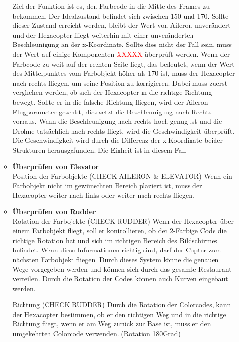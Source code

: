 \begin{itemize}
\begin{itemize}
        Ziel der Funktion ist es, den Farbcode in die Mitte des Frames zu bekommen. Der Idealzustand befindet sich zwischen 150 und 170.
        Sollte dieser Zustand erreicht werden, bleibt der Wert von Aileron unverändert und der Hexacopter fliegt weiterhin mit einer unveränderten Beschleunigung an der
        x-Koordinate.
        Sollte dies nicht der Fall sein, muss der Wert auf einige Komponenten \textcolor{red}{XXXXX} überprüft werden.
        Wenn der Farbcode zu weit auf der rechten Seite liegt, das bedeutet, wenn der Wert des Mittelpunktes vom Farbobjekt höher als 170 ist,
        muss der Hexacopter nach rechts fliegen, um seine Position zu korrigieren.
        Dabei muss zuerst verglichen werden, ob sich der Hexacopter in die richtige Richtung bewegt. Sollte er in die falsche Richtung
        fliegen, wird der Aileron-Flugparameter gesenkt, dies setzt die Beschleunigung nach Rechts vorraus.
        Wenn die Beschleunigung nach rechts hoch genug ist und die Drohne tatsächlich nach rechts fliegt, wird die Geschwindigkeit überprüft.
        Die Geschwindigkeit wird durch die Differenz der x-Koordinate beider Strukturen herausgefunden. Die Einheit ist in diesem Fall

        \item \textbf{Überprüfen von Elevator}\\
        Position der Farbobjekte (CHECK AILERON \& ELEVATOR)
        Wenn ein Farbobjekt nicht im gewünschten Bereich plaziert ist, muss der Hexacopter weiter nach links oder weiter nach rechts fliegen.
        \item \textbf{Überprüfen von Rudder}\\
        Rotation der Farbojekte (CHECK RUDDER)
        Wenn der Hexacopter über einem Farbobjekt fliegt, soll er kontrollieren, ob der 2-Farbige Code die richtige Rotation hat und sich im richtigen Bereich des Bildschirmes befindet. Wenn diese Informationen richtig sind, darf der Copter zum nächsten Farbobjekt fliegen.
        Durch dieses System könne die genauen Wege vorgegeben werden und können sich durch das gesamte Restaurant verteilen. Durch die Rotation der Codes können auch Kurven eingebaut werden.

        Richtung (CHECK RUDDER)
        Durch die Rotation der Colorcodes, kann der Hexacopter bestimmen, ob er den richtigen Weg und in die richtige Richtung fliegt, wenn er am Weg zurück zur Base ist, muss er den umgekehrten Colorcode verwenden. (Rotation 180Grad)
      \end{itemize}


\end{itemize}
